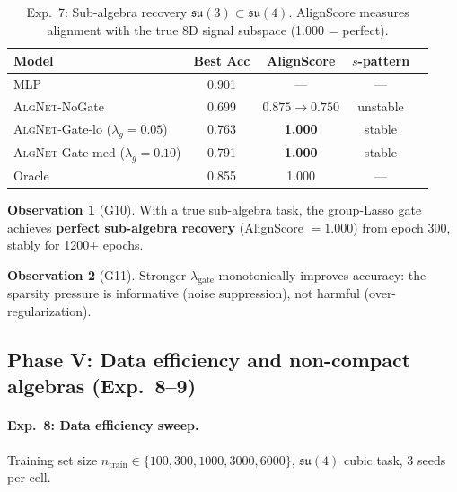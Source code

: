 \documentclass[11pt,a4paper]{article}
\newcommand{\fksu}{\mathfrak{su}}
\newcommand{\AlgNet}{\textsc{AlgNet}}
\theoremstyle{definition}
\newtheorem{observation}{Observation}
\begin{document}
\begin{table}[H]
\centering
\caption{Exp.~7: Sub-algebra recovery $\fksu(3) \subset \fksu(4)$.
AlignScore measures alignment with the true 8D signal subspace 
(1.000 = perfect).}
\label{tab:exp7}
\begin{tabular}{lcccc}
\toprule
Model & Best Acc & AlignScore & $s$-pattern \\
\midrule
MLP & 0.901 & --- & --- \\
\AlgNet{}-NoGate & 0.699 & $0.875 \to 0.750$ & unstable \\
\AlgNet{}-Gate-lo ($\lambda_g = 0.05$) & 0.763 & \textbf{1.000} & stable \\
\AlgNet{}-Gate-med ($\lambda_g = 0.10$) & 0.791 & \textbf{1.000} & stable \\
Oracle & 0.855 & 1.000 & --- \\
\bottomrule
\end{tabular}
\end{table}

\begin{observation}[G10]
With a true sub-algebra task, the group-Lasso gate achieves 
\textbf{perfect sub-algebra recovery} (AlignScore $= 1.000$) from 
epoch 300, stably for 1200+ epochs.
\end{observation}

\begin{observation}[G11]
Stronger $\lambda_{\mathrm{gate}}$ monotonically improves accuracy: 
the sparsity pressure is informative (noise suppression), not harmful 
(over-regularization).
\end{observation}


\subsection{Phase V: Data efficiency and non-compact algebras (Exp.~8--9)}
\label{sec:phase5}

\paragraph{Exp.~8: Data efficiency sweep.}
Training set size $n_{\mathrm{train}} \in \{100, 300, 1000, 3000, 6000\}$, 
$\fksu(4)$ cubic task, 3 seeds per cell.
\end{document}
